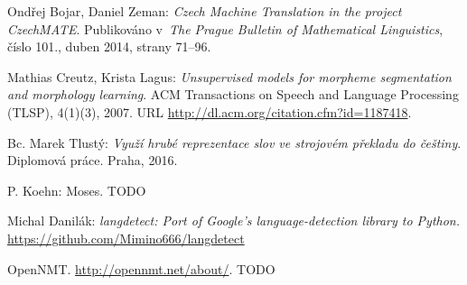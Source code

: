 \documentclass[a4]{article}
\begin{document}
\begin{thebibliography}{99}



 Ondřej Bojar, Daniel Zeman: {\sl Czech Machine Translation in the project
 CzechMATE}. Publikováno v~{\sl The Prague Bulletin of Mathematical
 Linguistics}, číslo 101., duben 2014, strany 71–96.

	Mathias Creutz, Krista Lagus: {\sl Unsupervised models for morpheme
	segmentation and
	morphology learning}. ACM Transactions on Speech and Language Processing
	(TLSP), 4(1)(3),
	2007. URL \url{http://dl.acm.org/citation.cfm?id=1187418}.

 Bc. Marek Tlustý: {\sl  Využí hrubé reprezentace slov ve strojovém
překladu do češtiny}. Diplomová práce. Praha, 2016.

 P. Koehn: Moses. TODO 



 Michal Danilák: {\sl langdetect: Port of Google's language-detection library to
 Python.}
 \url{https://github.com/Mimino666/langdetect}

 OpenNMT. \url{http://opennmt.net/about/}. TODO





\end{thebibliography}
\end{document}
